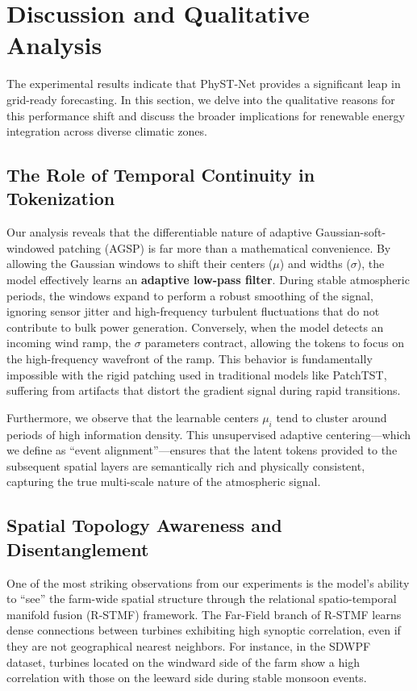 \section{Discussion and Qualitative Analysis}
\label{sec:discussion}
The experimental results indicate that PhyST-Net provides a significant leap in grid-ready forecasting. In this section, we delve into the qualitative reasons for this performance shift and discuss the broader implications for renewable energy integration across diverse climatic zones.

\subsection{The Role of Temporal Continuity in Tokenization}
\label{sec:tokenization_role}
Our analysis reveals that the differentiable nature of adaptive Gaussian-soft-windowed patching (AGSP) is far more than a mathematical convenience. By allowing the Gaussian windows to shift their centers ($\mu$) and widths ($\sigma$), the model effectively learns an \textbf{adaptive low-pass filter}. During stable atmospheric periods, the windows expand to perform a robust smoothing of the signal, ignoring sensor jitter and high-frequency turbulent fluctuations that do not contribute to bulk power generation. Conversely, when the model detects an incoming wind ramp, the $\sigma$ parameters contract, allowing the tokens to focus on the high-frequency wavefront of the ramp. This behavior is fundamentally impossible with the rigid patching used in traditional models like PatchTST, suffering from artifacts that distort the gradient signal during rapid transitions.

Furthermore, we observe that the learnable centers $\mu_i$ tend to cluster around periods of high information density. This unsupervised adaptive centering—which we define as ``event alignment''—ensures that the latent tokens provided to the subsequent spatial layers are semantically rich and physically consistent, capturing the true multi-scale nature of the atmospheric signal.

\subsection{Spatial Topology Awareness and Disentanglement}
\label{sec:topology_awareness}
One of the most striking observations from our experiments is the model's ability to ``see'' the farm-wide spatial structure through the relational spatio-temporal manifold fusion (R-STMF) framework. The Far-Field branch of R-STMF learns dense connections between turbines exhibiting high synoptic correlation, even if they are not geographical nearest neighbors. For instance, in the SDWPF dataset, turbines located on the windward side of the farm show a high correlation with those on the leeward side during stable monsoon events.


